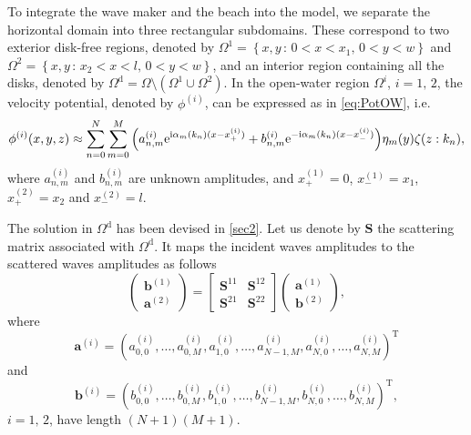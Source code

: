 \documentclass[12pt,a4paper]{article}
\def\ci{{\mathrm i}}
\renewcommand{\exp}{{\rm e}}
\newcommand{\ie}{i.e.\ }
\newcommand{\vp}{{\phi}}
\newcommand{\vm}{{\zeta}}
\newcommand{\ym}{{\eta}}
\newcommand{\kx}{\alpha}
\begin{document}
To integrate the wave maker and the beach into the model, we separate the horizontal domain into three 
rectangular subdomains. These correspond to two exterior disk-free regions, denoted by $\Omega^{1} = 
\left\{x,y\,:\,0<x<x_1,\,0<y<w\right\}$ and $\Omega^{2} = \left\{x,y\,:\,x_2<x<l,\,0<y<w\right\}$, and an 
interior region containing all the disks, denoted by $\Omega^{\mathrm{d}} = \Omega \setminus 
\left(\Omega^{1} \cup \Omega^{2}\right)$. In the open-water region $\Omega^{i}$, $i=1,\,2$, the velocity 
potential, denoted by $\vp^{(i)}$, can be expressed as in \eqref{eq:PotOW}, \ie
\begin{equation}
\vp^{(i)}(x,y,z) \approx \sum_{n=0}^{N} \sum_{m=0}^{M} 
\Big(a^{(i)}_{n,m}\exp^{\ci\kx_{m}(k_{n})(x-x^{(i)}_+)} + 
b^{(i)}_{n,m}\exp^{-\ci\kx_{m}(k_{n}) (x-x^{(i)}_-)}\Big) \ym_{m}(y) \vm(z:k_{n}),
\end{equation}
where $a^{(i)}_{n,m}$ and $b^{(i)}_{n,m}$ are unknown amplitudes, and $x^{(1)}_+=0$, $x^{(1)}_-=x_1$, 
$x^{(2)}_+=x_2$ and $x^{(2)}_-=l$.

The solution in $\Omega^{\mathrm{d}}$ has been devised in \textsection \ref{sec2}. Let us denote by 
$\mathbf{S}$ the scattering matrix associated with $\Omega^{\mathrm{d}}$. It maps the incident waves 
amplitudes to the scattered waves amplitudes as follows
\begin{equation}
	\label{eq:disk_scat}
	\left(
	\begin{array}{c}
		\mathbf{b}^{(1)} \\
		\mathbf{a}^{(2)}
	\end{array}
	\right) = \left[
	\begin{array}{cc}
	\mathbf{S}^{11} & \mathbf{S}^{12} \\
	\mathbf{S}^{21} & \mathbf{S}^{22}
	\end{array}
	\right] \left(
	\begin{array}{c}
		\mathbf{a}^{(1)} \\
		\mathbf{b}^{(2)}
	\end{array}
	\right),
\end{equation}
where 
\[
	\mathbf{a}^{(i)} = \left(a^{(i)}_{0,0},\ldots,a^{(i)}_{0,M},a^{(i)}_{1,0},\ldots,a^{(i)}_{N-1,M},
	a^{(i)}_{N,0},\ldots,a^{(i)}_{N,M}\right)^{\mathrm{T}}
\]
and 
\[
	\mathbf{b}^{(i)} = \left(b^{(i)}_{0,0},\ldots,b^{(i)}_{0,M},b^{(i)}_{1,0},\ldots,b^{(i)}_{N-1,M},
	b^{(i)}_{N,0},\ldots,b^{(i)}_{N,M}\right)^{\mathrm{T}},
\]
$i=1,\,2$, have length $(N+1)(M+1)$.
\end{document}
